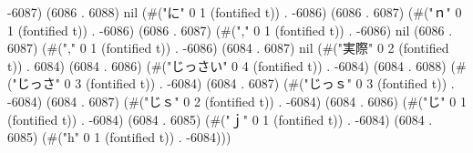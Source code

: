 -6087) (6086 . 6088) nil (#("に" 0 1 (fontified t)) . -6086) (6086 . 6087) (#("ｎ" 0 1 (fontified t)) . -6086) (6086 . 6087) (#("," 0 1 (fontified t)) . -6086) nil (6086 . 6087) (#("," 0 1 (fontified t)) . -6086) (6084 . 6087) nil (#("実際" 0 2 (fontified t)) . 6084) (6084 . 6086) (#("じっさい" 0 4 (fontified t)) . -6084) (6084 . 6088) (#("じっさ" 0 3 (fontified t)) . -6084) (6084 . 6087) (#("じっｓ" 0 3 (fontified t)) . -6084) (6084 . 6087) (#("じｓ" 0 2 (fontified t)) . -6084) (6084 . 6086) (#("じ" 0 1 (fontified t)) . -6084) (6084 . 6085) (#("ｊ" 0 1 (fontified t)) . -6084) (6084 . 6085) (#("h" 0 1 (fontified t)) . -6084)))
